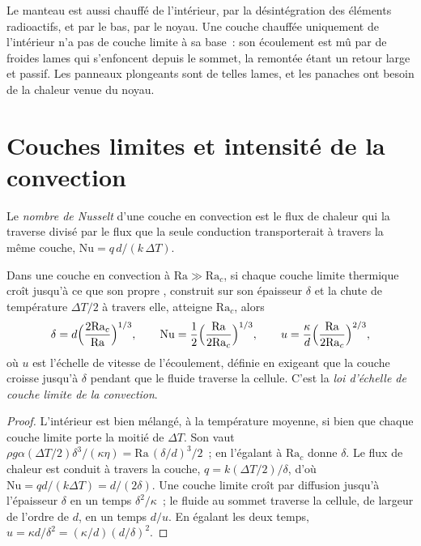 Le manteau est aussi chauffé de l'intérieur, par la désintégration des éléments radioactifs,
et par le bas, par le noyau. Une couche chauffée uniquement de l'intérieur n'a pas de
couche limite à sa base~: son écoulement est mû par de froides lames qui s'enfoncent depuis le
sommet, la remontée étant un retour large et passif. Les panneaux plongeants sont de telles lames, et
les panaches ont besoin de la chaleur venue du noyau.

\section{Couches limites et intensité de la convection}

\begin{definition}\label{def:b3:mantle-convection:nusselt}
Le \emph{nombre de Nusselt} d'une couche en convection est le
flux de chaleur qui la traverse divisé par le flux que la seule conduction transporterait
à travers la même couche, $\mathrm{Nu} = q\,d/(k\,\Delta T)$.
\end{definition}

\begin{theorem}\label{thm:b3:mantle-convection:scaling}
Dans une couche en convection à $\mathrm{Ra} \gg \mathrm{Ra}_c$, si chaque couche limite thermique
croît jusqu'à ce que son propre , construit sur son épaisseur
$\delta$ et la chute de température $\Delta T/2$ à travers elle, atteigne
$\mathrm{Ra}_c$, alors
\[
  \delta = d\Bigl(\frac{2\mathrm{Ra}_c}{\mathrm{Ra}}\Bigr)^{1/3},\qquad
  \mathrm{Nu} = \frac12\Bigl(\frac{\mathrm{Ra}}{2\mathrm{Ra}_c}\Bigr)^{1/3},
  \qquad
  u = \frac\kappa d\Bigl(\frac{\mathrm{Ra}}{2\mathrm{Ra}_c}\Bigr)^{2/3},
\]
où $u$ est l'échelle de vitesse de l'écoulement, définie en exigeant que la
couche croisse jusqu'à $\delta$ pendant que le fluide traverse la cellule. C'est la
\emph{loi d'échelle de couche limite de la convection}.
\end{theorem}

\begin{proof}
L'intérieur est bien mélangé, à la température moyenne, si bien que chaque couche limite
porte la moitié de $\Delta T$. Son  vaut $\rho g\alpha(\Delta T/2)
\delta^3/(\kappa\eta) = \mathrm{Ra}\,(\delta/d)^3/2$~; en l'égalant à
$\mathrm{Ra}_c$ donne $\delta$. Le flux de chaleur est conduit à travers la couche,
$q = k(\Delta T/2)/\delta$, d'où $\mathrm{Nu} = qd/(k\Delta T) = d/(2\delta)$.
Une couche limite croît par diffusion jusqu'à l'épaisseur $\delta$ en un temps
$\delta^2/\kappa$~; le fluide au sommet traverse la cellule, de largeur de l'ordre de
$d$, en un temps $d/u$. En égalant les deux temps, $u = \kappa d/\delta^2 =
(\kappa/d)(d/\delta)^2$.
\end{proof}

